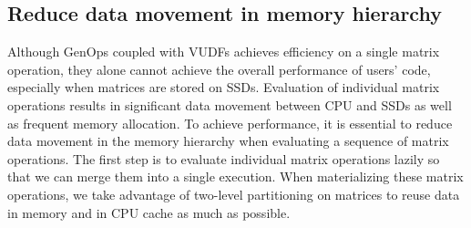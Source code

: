 

\subsection{Reduce data movement in memory hierarchy}
Although GenOps coupled with VUDFs achieves efficiency on a single matrix
operation, they alone cannot achieve the overall performance of users' code,
especially when matrices are stored on SSDs. Evaluation of individual matrix
operations results in significant data movement between CPU and SSDs
as well as frequent memory allocation. To achieve performance, it is essential
to reduce data movement in the memory hierarchy when evaluating a sequence
of matrix operations. The first step is to evaluate individual matrix operations
lazily so that we can merge them into a single execution. When materializing
these matrix operations, we take advantage of two-level partitioning
on matrices to reuse data in memory and in CPU cache as much as possible.

